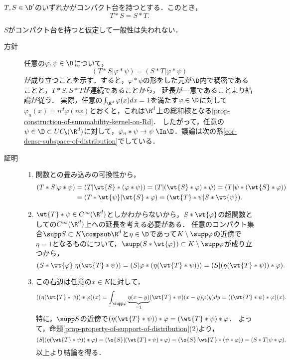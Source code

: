 \documentclass[uplatex,dvipdfmx]{jsreport}
\begin{document}
\begin{proposition}[畳み込みの可換性]
    $T,S\in\D'$のいずれかがコンパクト台を持つとする．このとき，
    \[T*S=S*T.\]
\end{proposition}
\begin{Proof}
    $S$がコンパクト台を持つと仮定して一般性は失われない．
    \begin{description}
        \item[方針] 任意の$\varphi,\psi\in\D$について，
        \[(T*S|\varphi*\psi)=(S*T|\varphi*\psi)\]
        が成り立つことを示す．すると，$\varphi*\psi$の形をした元が$\D$内で稠密であることと，$T*S,S*T$が連続であることから，
        延長が一意であることより結論が従う．
        実際，任意の$\int_{\R^d}\varphi(x)dx=1$を満たす$\varphi\in\D$に対して$\varphi_n(x)=n^d\varphi(nx)$とおくと，これは$\R^d$上の総和核となる\ref{prop-construction-of-summability-kernel-on-Rd}．
        したがって，任意の$\psi\in\D\subset UC_b(\R^d)$に対して，$\varphi_n*\psi\to\psi\;\In\D$．議論は次の系\ref{cor-dense-subspace-of-distribution}でしている．
        \item[証明] 
        \begin{enumerate}[{Step}1]
            \item 関数との畳み込みの可換性から，
            \begin{align*}
                (T*S|\varphi*\psi)&=(T|\wt{S}*(\varphi*\psi))=(T|(\wt{S}*\varphi)*\psi)=(T|\psi*(\wt{S}*\varphi))\\
                &=(T*\wt{\psi}|\wt{S}*\varphi)=(\wt{T}*\psi|S*\wt{\psi}).
            \end{align*}
            \item $\wt{T}*\psi\in C^\infty(\R^d)$としかわからないから，$S*\wt{\varphi}$の超関数としての$C^\infty(\R^d)$上への延長を考える必要がある．
            任意のコンパクト集合$\supp S\subset K\compsub\R^d$と$\eta\in\D$であって$K\setminus\supp\varphi$の近傍で$\eta=1$となるものについて，$\supp(S*\wt{\varphi})\subset K\setminus\supp\varphi$が成り立つから，
            \[(S*\wt{\varphi}|\eta(\wt{T}*\psi))=(S|\varphi*(\eta(\wt{T}*\psi)))=(S|(\eta(\wt{T}*\psi))*\varphi).\]
            \item この右辺は任意の$x\in K$に対して，
            \[((\eta(\wt{T}*\psi))*\varphi)(x)=\int_{\supp\varphi}\underbrace{\eta(x-y)}_{=1}(\wt{T}*\psi)(x-y)\varphi(y)dy=((\wt{T}*\psi)*\varphi)(x).\]
            特に，$\supp S$の近傍で$(\eta(\wt{T}*\psi))*\varphi=(\wt{T}*\psi)*\varphi$．
            よって，命題\ref{prop-property-of-support-of-distribution}(2)より，
            \[(S|(\eta(\wt{T}*\psi))*\varphi)=(\o{S}|(\wt{T}*\psi)*\varphi)=(\o{S}|\wt{T}*(\psi*\varphi))=(S*T|\psi*\varphi).\]
            以上より結論を得る．
        \end{enumerate}
    \end{description}
\end{Proof}
\end{document}
